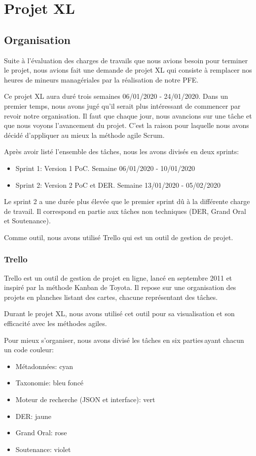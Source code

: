 
\section{Projet XL}
\subsection{Organisation}

Suite à l'évaluation des charges de travails que nous avions besoin pour terminer le projet, nous avions fait une demande de projet XL qui consiste à remplacer nos heures de mineurs managériales par la réalisation de notre PFE\@. 

Ce projet XL aura duré trois semaines 06/01/2020 - 24/01/2020.
Dans un premier temps, nous avons jugé qu'il serait plus intéressant de commencer par revoir notre organisation.
Il faut que chaque jour, nous avancions sur une tâche et que nous voyons l'avancement du projet.
C’est la raison pour laquelle nous avons décidé d’appliquer au mieux la méthode agile Scrum. 

Après avoir listé l’ensemble des tâches, nous les avons divisés en deux sprints:
\begin{itemize}
\item Sprint 1:
Version 1 PoC.
Semaine 06/01/2020 - 10/01/2020
\item Sprint 2:
Version 2 PoC et DER\@.
Semaine 13/01/2020 - 05/02/2020
\end{itemize}

Le sprint 2 a une durée plus élevée que le premier sprint dû à la différente charge de travail.
Il correspond en partie aux tâches non techniques (DER, Grand Oral et Soutenance).

Comme outil, nous avons utilisé Trello qui est un outil de gestion de projet. 

\subsubsection{Trello}
Trello est un outil de gestion de projet en ligne, lancé en septembre 2011 et inspiré par la méthode Kanban de Toyota.
Il repose sur une organisation des projets en planches listant des cartes, chacune représentant des tâches.

Durant le projet XL, nous avons utilisé cet outil pour sa visualisation et son efficacité avec les méthodes agiles. 

Pour mieux s’organiser, nous avons divisé les tâches en six parties ayant chacun un code couleur:
\begin{itemize}
\item Métadonnées: cyan
\item Taxonomie: bleu foncé
\item Moteur de recherche (JSON et interface): vert
\item DER\@: jaune
\item Grand Oral: rose
\item Soutenance: violet
\end{itemize}


